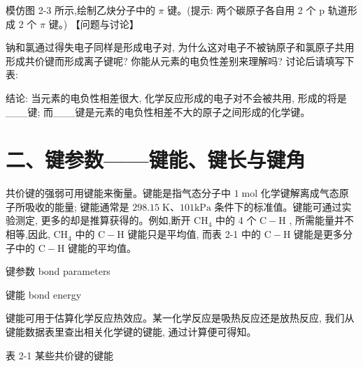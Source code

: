 \documentclass[10pt]{article}
\begin{document}
模仿图 2-3 所示,绘制乙炔分子中的 \(\pi\) 键。(提示: 两个碳原子各自用 2 个 \(\mathrm{p}\) 轨道形成 2 个 \(\pi\) 键。) 【问题与讨论】

钠和氯通过得失电子同样是形成电子对, 为什么这对电子不被钠原子和氯原子共用形成共价键而形成离子键呢? 你能从元素的电负性差别来理解吗? 讨论后请填写下表:

\begin{center}
\end{center}

结论: 当元素的电负性相差很大, 化学反应形成的电子对不会被共用, 形成的将是\_\_\_键; 而\_\_\_键是元素的电负性相差不大的原子之间形成的化学键。

\section*{二、键参数——键能、键长与键角}

共价键的强弱可用键能来衡量。键能是指气态分子中 \(1\mathrm{\;{mol}}\) 化学键解离成气态原子所吸收的能量; 键能通常是 \({298.15}\mathrm{\;K}\text{、}{101}\mathrm{{kPa}}\) 条件下的标准值。键能可通过实验测定, 更多的却是推算获得的。例如,断开 \({\mathrm{{CH}}}_{4}\) 中的 4 个 \(\mathrm{C} - \mathrm{H}\) , 所需能量并不相等,因此, \({\mathrm{{CH}}}_{4}\) 中的 \(\mathrm{C} - \mathrm{H}\) 键能只是平均值, 而表 2-1 中的 \(\mathrm{C} - \mathrm{H}\) 键能是更多分子中的 \(\mathrm{C} - \mathrm{H}\) 键能的平均值。

\begin{mdframed}

键参数 bond parameters

键能 bond energy

\end{mdframed}

键能可用于估算化学反应热效应。某一化学反应是吸热反应还是放热反应, 我们从键能数据表里查出相关化学键的键能, 通过计算便可得知。

表 2-1 某些共价键的键能
\end{document}
